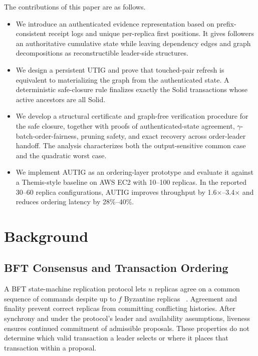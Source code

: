The contributions of this paper are as follows.
\begin{itemize}
  \item We introduce an authenticated evidence representation based on
  prefix-consistent receipt logs and unique per-replica first positions. It
  gives followers an authoritative cumulative state while leaving dependency
  edges and graph decompositions as reconstructible leader-side structures.

  \item We design a persistent UTIG and prove that touched-pair refresh is
  equivalent to materializing the graph from the authenticated state. A
  deterministic safe-closure rule finalizes exactly the Solid transactions
  whose active ancestors are all Solid.

  \item We develop a structural certificate and graph-free verification
  procedure for the safe closure, together with proofs of authenticated-state
  agreement, $\gamma$-batch-order-fairness, pruning safety, and exact recovery
  across order-leader handoff. The analysis characterizes both the
  output-sensitive common case and the quadratic worst case.

  \item We implement AUTIG as an ordering-layer prototype and evaluate it
  against a Themis-style baseline on AWS EC2 with 10--100 replicas. In the
  reported 30--60 replica configurations, AUTIG improves throughput by
  1.6$\times$--3.4$\times$ and reduces ordering latency by 28\%--40\%.
\end{itemize}

\section{Background}
\label{sec:background}

\subsection{BFT Consensus and Transaction Ordering}

A BFT state-machine replication protocol lets $n$ replicas agree on a common
sequence of commands despite up to $f$ Byzantine replicas
~\cite{schneider1990implementing,castro1999practical,yin2019hotstuff}.
Agreement and finality prevent correct replicas from committing conflicting
histories. After synchrony and under the protocol's leader and availability
assumptions, liveness ensures continued commitment of admissible proposals.
These properties do not determine which valid transaction a leader selects or
where it places that transaction within a proposal.


